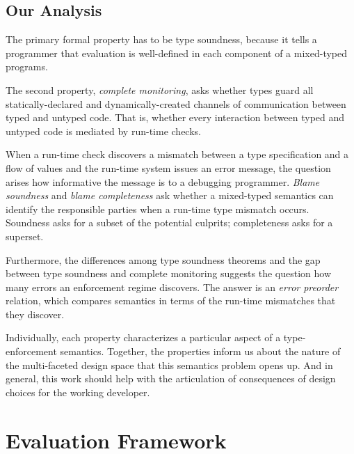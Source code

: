 \documentclass[ twoside,open=right,titlepage,numbers=noenddot,headinclude,%
                footinclude=true,cleardoublepage=empty,abstract=off,
                BCOR=5mm,paper=a4,fontsize=11pt,%
                ngerman,american,%
                parts,pdfspacing]{scrreprt}
\let\SOriginalthesubsubsection\thesubsubsection
\newcommand{\Ssubsection}[2]{\subsection[#1]{#2}\let\thesubsubsection\SOriginalthesubsubsection}
\newcommand{\Ssubsubsection}[2]{\subsubsection[#1]{#2}}
\renewcommand{\Ssubsection}[2]{\section[#1]{#2}}
\renewcommand{\Ssubsubsection}[2]{\subsection[#1]{#2}}
\begin{document}
\Ssubsubsection{Our Analysis}{Our Analysis}\label{t:x28part_x22Ourx5fAnalysisx22x29}

The primary formal property has to be type soundness, because it tells a
programmer that evaluation is well{-}defined in each component of a mixed{-}typed programs.

The second property, \emph{complete monitoring}, asks whether types
guard all statically{-}declared and dynamically{-}created channels of
communication between typed and untyped code. That is, whether every interaction
between typed and untyped code is mediated by run{-}time checks.

When a run{-}time check discovers a mismatch between a type specification and
a flow of values and the run{-}time system issues an error message, the
question arises how informative the message is to a debugging programmer.
\emph{Blame soundness} and \emph{blame completeness} ask whether a
mixed{-}typed semantics can identify the responsible parties when a run{-}time
type mismatch occurs.  Soundness asks for a subset of the potential
culprits; completeness asks for a superset.

Furthermore, the differences among type soundness theorems and the
gap between type soundness and complete monitoring suggests the
question how many errors an enforcement regime discovers. The answer is an
\emph{error preorder} relation, which compares semantics in terms of
the run{-}time mismatches that they discover.

Individually, each property characterizes a particular aspect of a
type{-}enforcement semantics. Together, the properties inform us about the
nature of the multi{-}faceted design space that this semantics problem opens
up. And in general, this work should help with the articulation of
consequences of design choices for the working developer.

\Ssubsection{Evaluation Framework}{Evaluation Framework}\label{t:x28part_x22secx3adesignx3abasicx22x29}

\label{sec:design:basic}
\end{document}
